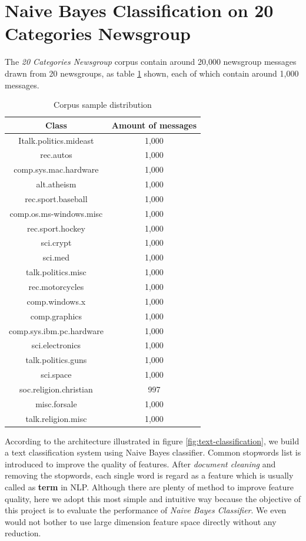\documentclass{article}
\begin{document}
\section{Naive Bayes Classification on 20 Categories Newsgroup}

The \textit{20 Categories Newsgroup} corpus \cite{corpus} contain around 20,000 newsgroup messages drawn from 20 newsgroups, as table \ref{table:corpus-dist} shown,  each of which contain around 1,000 messages.

\begin{table}[!ht]
	\centering
	\begin{tabular}{ |c|c| }
		\hline
		\textbf{Class} & \textbf{Amount of messages}\\
		\hline
		Italk.politics.mideast & 1,000 \\
		\hline
	    rec.autos & 1,000 \\
		\hline
		comp.sys.mac.hardware & 1,000 \\
		\hline
		alt.atheism & 1,000 \\
		\hline
		rec.sport.baseball & 1,000 \\
		\hline
		comp.os.ms-windows.misc & 1,000 \\
		\hline
		rec.sport.hockey & 1,000 \\
		\hline
		sci.crypt & 1,000 \\
		\hline
		sci.med & 1,000 \\
		\hline
		talk.politics.misc & 1,000 \\
		\hline
		rec.motorcycles & 1,000 \\
		\hline
		comp.windows.x & 1,000 \\
		\hline
		comp.graphics & 1,000 \\
		\hline
		comp.sys.ibm.pc.hardware & 1,000 \\
		\hline
		sci.electronics & 1,000 \\
		\hline
		talk.politics.guns & 1,000 \\
		\hline
		sci.space & 1,000 \\
		\hline
		soc.religion.christian & 997 \\
		\hline
		misc.forsale & 1,000 \\
		\hline
		talk.religion.misc & 1,000 \\
		\hline
	\end{tabular}
	\caption{Corpus sample distribution}
	\label{table:corpus-dist}
\end{table}

According to the architecture illustrated in figure \ref{fig:text-classification}, we build a text classification system using Naive Bayes classifier. Common stopwords list \cite{stopwords-list} is introduced to improve the quality of features. After \textit{document cleaning} and removing the stopwords, each single word is regard as a feature which is usually called as \textbf{term} in NLP. Although there are plenty of method to improve feature quality, here we adopt this most simple and intuitive way because the objective of this project is to evaluate the performance of \textit{Naive Bayes Classifier}. We even would not bother to use large dimension feature space directly without any reduction. 
\end{document}
